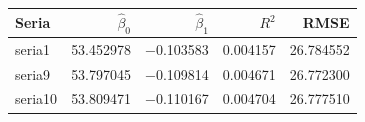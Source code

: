 \begin{tabular}{lrrrr}
\toprule
Seria & $\hat\beta_0$ & $\hat\beta_1$ & $R^2$ & RMSE \\
\midrule
seria1 & \num{53.452978} & \num{-0.103583} & \num{0.004157} & \num{26.784552} \\
seria9 & \num{53.797045} & \num{-0.109814} & \num{0.004671} & \num{26.772300} \\
seria10 & \num{53.809471} & \num{-0.110167} & \num{0.004704} & \num{26.777510} \\
\bottomrule
\end{tabular}

